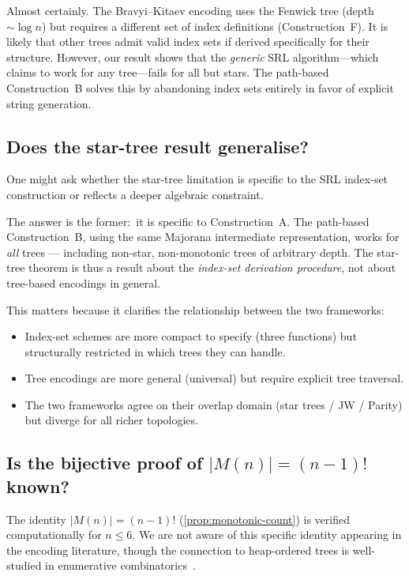 Almost certainly.  The Bravyi--Kitaev encoding uses the Fenwick tree
(depth $\sim \log n$) but requires a different set of index
definitions (Construction~F).  It is likely that other trees admit
valid index sets if derived specifically for their structure.
However, our result shows that the \emph{generic} SRL algorithm---which
claims to work for any tree---fails for all but stars.  The path-based
Construction~B solves this by abandoning index sets entirely in favor
of explicit string generation.

\subsection{Does the star-tree result generalise?}
\label{sec:concern-generalise}

One might ask whether the star-tree limitation is specific to the SRL
index-set construction or reflects a deeper algebraic constraint.

The answer is the former:\ it is specific to Construction~A.  The
path-based Construction~B, using the same Majorana intermediate
representation, works for \emph{all} trees --- including non-star,
non-monotonic trees of arbitrary depth.  The star-tree theorem is thus
a result about the \emph{index-set derivation procedure}, not about
tree-based encodings in general.

This matters because it clarifies the relationship between the two
frameworks:
\begin{itemize}
  \item Index-set schemes are more compact to specify (three
    functions) but structurally restricted in which trees they can
    handle.
  \item Tree encodings are more general (universal) but require
    explicit tree traversal.
  \item The two frameworks agree on their overlap domain (star
    trees / JW / Parity) but diverge for all richer topologies.
\end{itemize}

\subsection{Is the bijective proof of $|M(n)| = (n{-}1)!$ known?}
\label{sec:concern-bijective}

The identity $|M(n)| = (n{-}1)!$ (\cref{prop:monotonic-count}) is
verified computationally for $n \le 6$.  We are not aware of this
specific identity appearing in the encoding literature, though the
connection to heap-ordered trees is well-studied in
enumerative combinatorics~\cite{bergeron1992}.

